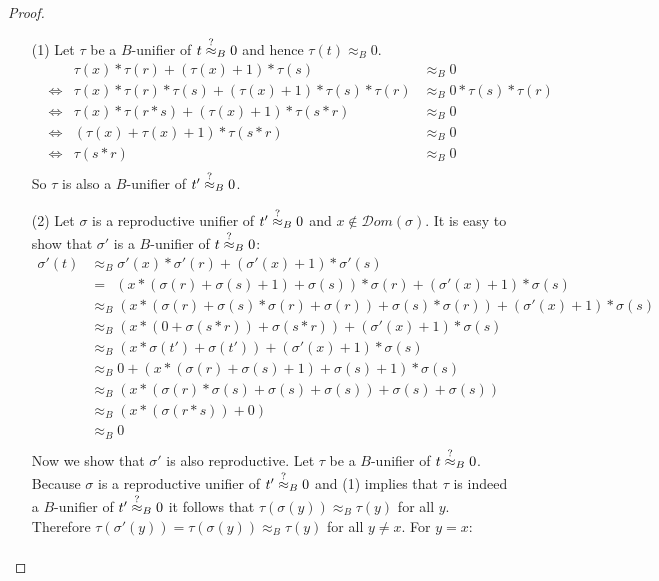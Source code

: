 		\begin{proof}\mbox{}
		\begin{itemize}
		\item[(1)] Let $\tau$ be a $B$-unifier of $t\stackrel{?}{\approx}_B0$ and hence $\tau(t)\approx_B0$.
		\begin{align*}
		&&\tau(x)*\tau(r)+(\tau(x)+1)*\tau(s)&\approx_B0\\
		&\iff&\tau(x)*\tau(r)*\tau(s)+(\tau(x)+1)*\tau(s)*\tau(r)&\approx_B0*\tau(s)*\tau(r)\\
		&\iff&\tau(x)*\tau(r*s)+(\tau(x)+1)*\tau(s*r)&\approx_B0\\
		&\iff&(\tau(x)+\tau(x)+1)*\tau(s*r)&\approx_B0\\
		&\iff&\tau(s*r)&\approx_B0\\
		\end{align*}
		So $\tau$ is also a $B$-unifier of $t'\stackrel{?}{\approx}_B0$.
		\item[(2)] Let $\sigma$ is a reproductive unifier of $t'\stackrel{?}{\approx}_B0$ and $x\notin\mathcal{D}om(\sigma)$. It is easy to show that $\sigma'$ is a $B$-unifier of $t\stackrel{?}{\approx}_B0$:
		\begin{align*}
		\sigma'(t)&\approx_B\sigma'(x)*\sigma'(r)+(\sigma'(x)+1)*\sigma'(s)\\
		&=\ \ (x*(\sigma(r)+\sigma(s)+1)+\sigma(s))*\sigma(r)+(\sigma'(x)+1)*\sigma(s)\\
		&\approx_B(x*(\sigma(r)+\sigma(s)*\sigma(r)+\sigma(r))+\sigma(s)*\sigma(r))+(\sigma'(x)+1)*\sigma(s)\\
		&\approx_B(x*(0+\sigma(s*r))+\sigma(s*r))+(\sigma'(x)+1)*\sigma(s)\\
		&\approx_B(x*\sigma(t')+\sigma(t'))+(\sigma'(x)+1)*\sigma(s)\\
		&\approx_B0+(x*(\sigma(r)+\sigma(s)+1)+\sigma(s)+1)*\sigma(s)\\
		&\approx_B(x*(\sigma(r)*\sigma(s)+\sigma(s)+\sigma(s))+\sigma(s)+\sigma(s))\\
		&\approx_B(x*(\sigma(r*s))+0)\\
		&\approx_B0\\
		\end{align*}
		Now we show that $\sigma'$ is also reproductive. Let $\tau$ be a $B$-unifier of $t\stackrel{?}{\approx}_B0$. Because $\sigma$ is a reproductive unifier of $t'\stackrel{?}{\approx}_B0$ and (1) implies that $\tau$ is indeed a $B$-unifier of $t'\stackrel{?}{\approx}_B0$ it follows that $\tau(\sigma(y))\approx_B\tau(y)$ for all $y$. Therefore $\tau(\sigma'(y))=\tau(\sigma(y))\approx_B\tau(y)$ for all $y\neq x$. For $y=x$:
		\begin{align*}

\end{align*}
\end{itemize}
\end{proof}
